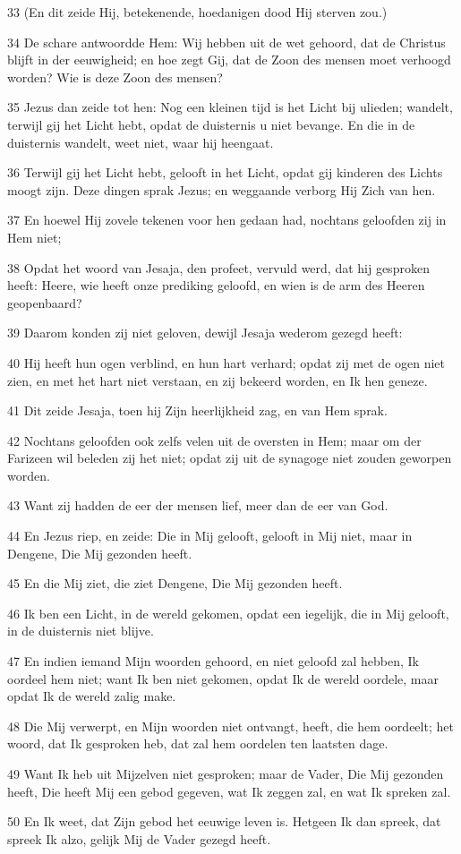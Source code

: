 \par 33 (En dit zeide Hij, betekenende, hoedanigen dood Hij sterven zou.)
\par 34 De schare antwoordde Hem: Wij hebben uit de wet gehoord, dat de Christus blijft in der eeuwigheid; en hoe zegt Gij, dat de Zoon des mensen moet verhoogd worden? Wie is deze Zoon des mensen?
\par 35 Jezus dan zeide tot hen: Nog een kleinen tijd is het Licht bij ulieden; wandelt, terwijl gij het Licht hebt, opdat de duisternis u niet bevange. En die in de duisternis wandelt, weet niet, waar hij heengaat.
\par 36 Terwijl gij het Licht hebt, gelooft in het Licht, opdat gij kinderen des Lichts moogt zijn. Deze dingen sprak Jezus; en weggaande verborg Hij Zich van hen.
\par 37 En hoewel Hij zovele tekenen voor hen gedaan had, nochtans geloofden zij in Hem niet;
\par 38 Opdat het woord van Jesaja, den profeet, vervuld werd, dat hij gesproken heeft: Heere, wie heeft onze prediking geloofd, en wien is de arm des Heeren geopenbaard?
\par 39 Daarom konden zij niet geloven, dewijl Jesaja wederom gezegd heeft:
\par 40 Hij heeft hun ogen verblind, en hun hart verhard; opdat zij met de ogen niet zien, en met het hart niet verstaan, en zij bekeerd worden, en Ik hen geneze.
\par 41 Dit zeide Jesaja, toen hij Zijn heerlijkheid zag, en van Hem sprak.
\par 42 Nochtans geloofden ook zelfs velen uit de oversten in Hem; maar om der Farizeen wil beleden zij het niet; opdat zij uit de synagoge niet zouden geworpen worden.
\par 43 Want zij hadden de eer der mensen lief, meer dan de eer van God.
\par 44 En Jezus riep, en zeide: Die in Mij gelooft, gelooft in Mij niet, maar in Dengene, Die Mij gezonden heeft.
\par 45 En die Mij ziet, die ziet Dengene, Die Mij gezonden heeft.
\par 46 Ik ben een Licht, in de wereld gekomen, opdat een iegelijk, die in Mij gelooft, in de duisternis niet blijve.
\par 47 En indien iemand Mijn woorden gehoord, en niet geloofd zal hebben, Ik oordeel hem niet; want Ik ben niet gekomen, opdat Ik de wereld oordele, maar opdat Ik de wereld zalig make.
\par 48 Die Mij verwerpt, en Mijn woorden niet ontvangt, heeft, die hem oordeelt; het woord, dat Ik gesproken heb, dat zal hem oordelen ten laatsten dage.
\par 49 Want Ik heb uit Mijzelven niet gesproken; maar de Vader, Die Mij gezonden heeft, Die heeft Mij een gebod gegeven, wat Ik zeggen zal, en wat Ik spreken zal.
\par 50 En Ik weet, dat Zijn gebod het eeuwige leven is. Hetgeen Ik dan spreek, dat spreek Ik alzo, gelijk Mij de Vader gezegd heeft.

